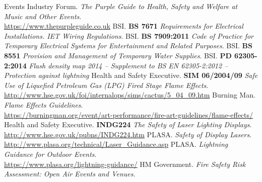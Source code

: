 \restoregeometry
\newpage
\begin{thebibliography}{18}
    Events Industry Forum.
    \textit{The Purple Guide to Health, Safety and Welfare at Music and Other Events}. \\
    \href{https://www.thepurpleguide.co.uk}{https://www.thepurpleguide.co.uk}
    BSI.
    \textbf{BS 7671} \textit{Requirements for Electrical Installations. IET Wiring Regulations}.
    BSI.
    \textbf{BS 7909:2011} \textit{Code of Practice for Temporary Electrical Systems for Entertainment and Related Purposes}.
    BSI.
    \textbf{BS 8551} \textit{Provision and Management of Temporary Water Supplies}.
    BSI.
    \textbf{PD 62305-2:2014} \textit{Flash density map 2014 – Supplement to BS EN 62305-2:2012 – Protection against lightning}
    Health and Safety Executive.
    \textbf{SIM 06/2004/09} \textit{Safe Use of Liquefied Petroleum Gas (LPG) Fired Stage Flame Effects}. \\
    \href{http://www.hse.gov.uk/foi/internalops/sims/cactus/5\_04\_09.htm}{http://www.hse.gov.uk/foi/internalops/sims/cactus/5\_04\_09.htm}
    Burning Man.
    \textit{Flame Effects Guidelines}. \\
    \href{https://burningman.org/event/art-performance/fire-art-guidelines/flame-effects/}{https://burningman.org/event/art-performance/fire-art-guidelines/flame-effects/}
    Health and Safety Executive.
    \textbf{INDG224} \textit{The Safety of Laser Lighting Displays}. \\
    \href{http://www.hse.gov.uk/pubns/INDG224.htm}{http://www.hse.gov.uk/pubns/INDG224.htm}
    PLASA.
    \textit{Safety of Display Lasers}. \\
    \href{http://www.plasa.org/technical/Laser\_Guidance.asp}{http://www.plasa.org/technical/Laser\_Guidance.asp}
    PLASA.
    \textit{Lightning Guidance for Outdoor Events}. \\
    \href{https://www.plasa.org/lightning-guidance/}{https://www.plasa.org/lightning-guidance/}
    HM Government.
    \textit{Fire Safety Risk Assessment: Open Air Events and Venues}. \\

\end{thebibliography}
